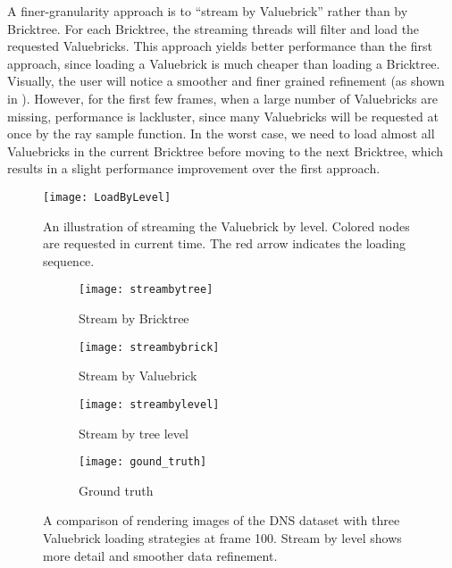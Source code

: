A finer-granularity approach is to ``stream by Valuebrick'' rather than by Bricktree. For each
Bricktree, the streaming threads will filter and load the requested Valuebricks. 
This approach yields better performance than the first approach, since loading a Valuebrick
is much cheaper than loading a Bricktree. Visually, the user will notice a smoother and finer grained refinement (as shown in ).
However, for the first few frames, when a large number of Valuebricks are missing, performance is lackluster, since many Valuebricks will be requested at once by the ray sample function.
In the worst case, we need to load almost all Valuebricks
in the current Bricktree before moving to the next Bricktree, which results in a slight performance improvement over the first approach.

\begin{figure}[t]
  \centering
    \texttt{[image: LoadByLevel]}
    \caption{\label{fig:loadbylevel}An illustration of streaming the Valuebrick by level. Colored nodes are requested in current time. The red arrow indicates the loading sequence.}
    \vspace{-1em}
\end{figure}

\begin{figure}[b]
    \centering
    \begin{subfigure}[b]{0.495\columnwidth}
        \texttt{[image: streambytree]}
        \vspace{-2em}
        \caption{Stream by Bricktree}
        \label{fig:streambytree}
    \end{subfigure}
    \begin{subfigure}[b]{0.495\columnwidth}
        \texttt{[image: streambybrick]}
        \vspace{-2em}
        \caption{Stream by Valuebrick}
        \label{fig:streambybrick}
    \end{subfigure}
    \begin{subfigure}[b]{0.495\columnwidth}
        \texttt{[image: streambylevel]}
        \vspace{-2em}
        \caption{Stream by tree level}
        \label{fig:streambylevel}
    \end{subfigure}
    \begin{subfigure}[b]{0.495\columnwidth}
        \texttt{[image: gound\_truth]}
        \vspace{-2em}
        \caption{Ground truth}
        \label{fig:streambylevel}
    \end{subfigure}
	\caption{\label{fig:streamstrategy}%
	A comparison of rendering images of the DNS dataset with three Valuebrick loading strategies at frame 100. Stream by level shows more detail and smoother data refinement.}
	\vspace{-1em}
\end{figure}

